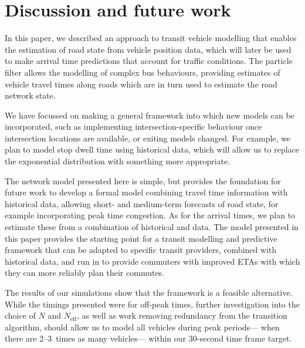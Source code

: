 \section{Discussion and future work}
\label{sec:discussion}

In this paper, we described an approach to transit vehicle modelling
that enables the \rt estimation of road state from vehicle position data,
which will later be used to make arrival time predictions
that account for \rt traffic conditions.
The particle filter allows the modelling of complex bus behaviours,
providing estimates of vehicle travel times along roads
which are in turn used to estimate the road network state.


We have focussed on making a general framework
into which new models can be incorporated,
such as implementing intersection-specific behaviour
once intersection locations are available,
or exiting models changed.
For example, we plan to model stop dwell time using historical data,
which will allow us to replace the exponential distribution
with something more appropriate.


The network model presented here is simple,
but provides the foundation for future work to
develop a formal model combining \rt travel time information with historical data,
allowing short- and medium-term forecasts of road state,
for example incorporating peak time congestion.
As for the arrival times,
we plan to estimate these from a combination of historical
and \rt data.
The model presented in this paper provides the starting point
for a transit modelling and predictive framework
that can be adapted to specific transit providers,
combined with historical data,
and run in \rt to provide commuters with
improved ETAs with which they can more reliably
plan their commutes.


The results of our simulations show that the framework is a
feasible \rt alternative.
While the timings presented were for off-peak times,
further investigation into the choice of $N$ and $N_\text{eff}$,
as well as work removing redundancy from the transition algorithm,
should allow us to model all vehicles during peak periods---%
when there are 2--3~times as many vehicles---%
within our 30-second time frame target.
